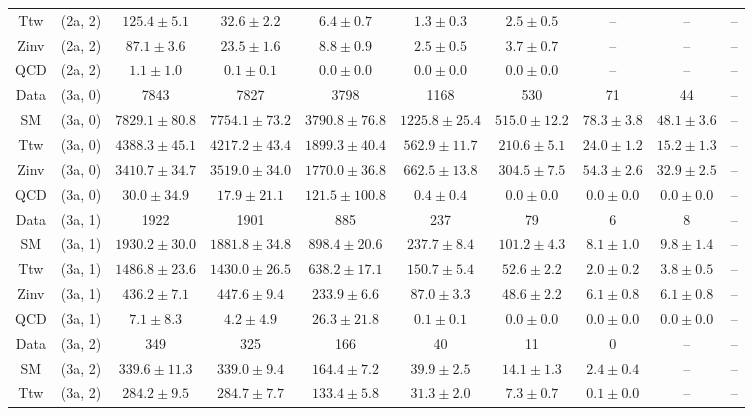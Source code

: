 \begin{table}[h!]
{\begin{tabular}{cccccccccc}
	Ttw & (2a, 2) & $125.4\pm 5.1$ & $32.6\pm 2.2$ & $6.4\pm 0.7$ & $1.3\pm 0.3$ & $2.5\pm 0.5$ & -- & -- & -- \\[0.5ex] 
	Zinv & (2a, 2) & $87.1\pm 3.6$ & $23.5\pm 1.6$ & $8.8\pm 0.9$ & $2.5\pm 0.5$ & $3.7\pm 0.7$ & -- & -- & -- \\[0.5ex] 
	QCD & (2a, 2) & $1.1\pm 1.0$ & $0.1\pm 0.1$ & $0.0\pm 0.0$ & $0.0\pm 0.0$ & $0.0\pm 0.0$ & -- & -- & -- \\[0.5ex] 
	Data & (3a, 0) & 7843 & 7827 & 3798 & 1168 & 530 & 71 & 44 & -- \\[0.5ex] 
	SM & (3a, 0) & $7829.1\pm 80.8$ & $7754.1\pm 73.2$ & $3790.8\pm 76.8$ & $1225.8\pm 25.4$ & $515.0\pm 12.2$ & $78.3\pm 3.8$ & $48.1\pm 3.6$ & -- \\[0.5ex] 
	Ttw & (3a, 0) & $4388.3\pm 45.1$ & $4217.2\pm 43.4$ & $1899.3\pm 40.4$ & $562.9\pm 11.7$ & $210.6\pm 5.1$ & $24.0\pm 1.2$ & $15.2\pm 1.3$ & -- \\[0.5ex] 
	Zinv & (3a, 0) & $3410.7\pm 34.7$ & $3519.0\pm 34.0$ & $1770.0\pm 36.8$ & $662.5\pm 13.8$ & $304.5\pm 7.5$ & $54.3\pm 2.6$ & $32.9\pm 2.5$ & -- \\[0.5ex] 
	QCD & (3a, 0) & $30.0\pm 34.9$ & $17.9\pm 21.1$ & $121.5\pm 100.8$ & $0.4\pm 0.4$ & $0.0\pm 0.0$ & $0.0\pm 0.0$ & $0.0\pm 0.0$ & -- \\[0.5ex] 
	Data & (3a, 1) & 1922 & 1901 & 885 & 237 & 79 & 6 & 8 & -- \\[0.5ex] 
	SM & (3a, 1) & $1930.2\pm 30.0$ & $1881.8\pm 34.8$ & $898.4\pm 20.6$ & $237.7\pm 8.4$ & $101.2\pm 4.3$ & $8.1\pm 1.0$ & $9.8\pm 1.4$ & -- \\[0.5ex] 
	Ttw & (3a, 1) & $1486.8\pm 23.6$ & $1430.0\pm 26.5$ & $638.2\pm 17.1$ & $150.7\pm 5.4$ & $52.6\pm 2.2$ & $2.0\pm 0.2$ & $3.8\pm 0.5$ & -- \\[0.5ex] 
	Zinv & (3a, 1) & $436.2\pm 7.1$ & $447.6\pm 9.4$ & $233.9\pm 6.6$ & $87.0\pm 3.3$ & $48.6\pm 2.2$ & $6.1\pm 0.8$ & $6.1\pm 0.8$ & -- \\[0.5ex] 
	QCD & (3a, 1) & $7.1\pm 8.3$ & $4.2\pm 4.9$ & $26.3\pm 21.8$ & $0.1\pm 0.1$ & $0.0\pm 0.0$ & $0.0\pm 0.0$ & $0.0\pm 0.0$ & -- \\[0.5ex] 
	Data & (3a, 2) & 349 & 325 & 166 & 40 & 11 & 0 & -- & -- \\[0.5ex] 
	SM & (3a, 2) & $339.6\pm 11.3$ & $339.0\pm 9.4$ & $164.4\pm 7.2$ & $39.9\pm 2.5$ & $14.1\pm 1.3$ & $2.4\pm 0.4$ & -- & -- \\[0.5ex] 
	Ttw & (3a, 2) & $284.2\pm 9.5$ & $284.7\pm 7.7$ & $133.4\pm 5.8$ & $31.3\pm 2.0$ & $7.3\pm 0.7$ & $0.1\pm 0.0$ & -- & -- \\[0.5ex] 

\end{tabular}}
\end{table}
